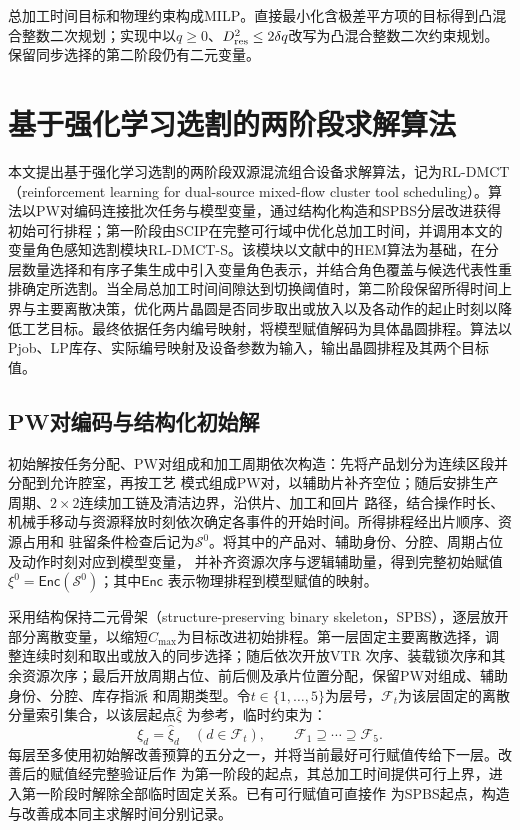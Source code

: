 \documentclass[preprint,12pt,nonatbib]{elsarticle}
\begin{document}
总加工时间目标和物理约束构成MILP。直接最小化含极差平方项的目标得到凸混合整数二次规划；实现中以$q\ge0$、$D_{\rm res}^2\le2\delta q$改写为凸混合整数二次约束规划。保留同步选择的第二阶段仍有二元变量。

\section{基于强化学习选割的两阶段求解算法}
\label{sec:algorithm-cn}

本文提出基于强化学习选割的两阶段双源混流组合设备求解算法，记为RL-DMCT（reinforcement learning for dual-source mixed-flow cluster tool scheduling）。算法以PW对编码连接批次任务与模型变量，通过结构化构造和SPBS分层改进获得初始可行排程；第一阶段由SCIP在完整可行域中优化总加工时间，并调用本文的变量角色感知选割模块RL-DMCT-S。该模块以文献中的HEM算法为基础，在分层数量选择和有序子集生成中引入变量角色表示，并结合角色覆盖与候选代表性重排确定所选割\citep{achterberg2009scip,bestuzheva2023scip,wang2023hem}。当全局总加工时间间隙达到切换阈值时，第二阶段保留所得时间上界与主要离散决策，优化两片晶圆是否同步取出或放入以及各动作的起止时刻以降低工艺目标。最终依据任务内编号映射，将模型赋值解码为具体晶圆排程。算法以Pjob、LP库存、实际编号映射及设备参数为输入，输出晶圆排程及其两个目标值。

\subsection{PW对编码与结构化初始解}
\label{sec:pjob-encoding-cn}

初始解按任务分配、PW对组成和加工周期依次构造：先将产品划分为连续区段并分配到允许腔室，再按工艺
模式组成PW对，以辅助片补齐空位；随后安排生产周期、$2\times2$连续加工链及清洁边界，沿供片、加工和回片
路径，结合操作时长、机械手移动与资源释放时刻依次确定各事件的开始时间。所得排程经出片顺序、资源占用和
驻留条件检查后记为$\mathcal S^0$。将其中的产品对、辅助身份、分腔、周期占位及动作时刻对应到模型变量，
并补齐资源次序与逻辑辅助量，得到完整初始赋值$\xi^0=\mathsf{Enc}(\mathcal S^0)$；其中$\mathsf{Enc}$
表示物理排程到模型赋值的映射。

采用结构保持二元骨架（structure-preserving binary skeleton，SPBS），逐层放开部分离散变量，以缩短$C_{\max}$为目标改进初始排程。第一层固定主要离散选择，调整连续时刻和取出或放入的同步选择；随后依次开放VTR
次序、装载锁次序和其余资源次序；最后开放周期占位、前后侧及承片位置分配，保留PW对组成、辅助身份、分腔、库存指派
和周期类型。令$t\in\{1,\ldots,5\}$为层号，$\mathcal F_t$为该层固定的离散分量索引集合，以该层起点$\widehat\xi$
为参考，临时约束为：
\begin{equation}
\xi_d=\widehat\xi_d\quad(d\in\mathcal F_t),\qquad
\mathcal F_1\supseteq\cdots\supseteq\mathcal F_5.
\label{eq:spbs-fix-cn}
\end{equation}
每层至多使用初始解改善预算的五分之一，并将当前最好可行赋值传给下一层。改善后的赋值经完整验证后作
为第一阶段的起点，其总加工时间提供可行上界，进入第一阶段时解除全部临时固定关系。已有可行赋值可直接作
为SPBS起点，构造与改善成本同主求解时间分别记录。
\end{document}
